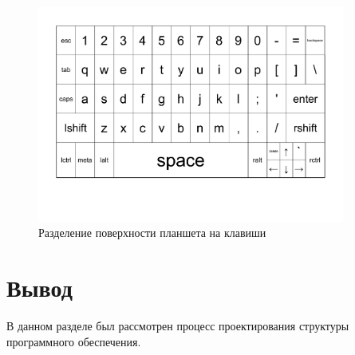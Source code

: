 \begin{figure}[H]
    \centering
    \includegraphics[trim=3cm 4cm 3cm 1.5cm, width=0.9\textwidth]{img/keyboard.pdf}
    \caption{Разделение поверхности планшета на клавиши}
    \label{fig:keyboard}
\end{figure}

\section{Вывод}

В данном разделе был рассмотрен процесс проектирования структуры программного обеспечения.
